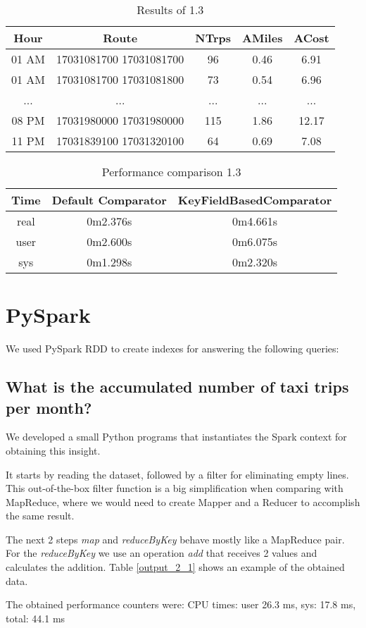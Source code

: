 \documentclass[conference,compsoc]{IEEEtran}
\begin{document}
\begin{table}[!t]
\renewcommand{\arraystretch}{1.3}
\caption{Results of 1.3}
\label{output_1_3}
\centering
\begin{tabular}{c|c||c|c|c}
\hline
\bfseries Hour & \bfseries Route & \bfseries NTrps & \bfseries AMiles & \bfseries ACost\\
\hline\hline

01 AM&17031081700 17031081700&96&0.46&6.91	\\
01 AM&17031081700 17031081800&73&0.54&6.96	\\
...&...&...&...&...	\\
08 PM&17031980000 17031980000&115&1.86&12.17\\
11 PM&17031839100 17031320100&64&0.69&7.08	\\

\hline
\end{tabular}
\end{table}

\begin{table}[!t]
\renewcommand{\arraystretch}{1.3}
\caption{Performance comparison 1.3}
\label{perf_1_4}
\centering
\begin{tabular}{c||c|c}
\hline
\bfseries Time & \bfseries Default Comparator & \bfseries KeyFieldBasedComparator \\
\hline\hline

 real & 0m2.376s           & 0m4.661s                \\
 user & 0m2.600s           & 0m6.075s                \\
 sys  & 0m1.298s           & 0m2.320s \\
\hline
\end{tabular}
\end{table}

\section{PySpark}
We used PySpark RDD to create indexes for answering the following queries:
\subsection{What is the accumulated number of taxi trips per month?}
We developed a small Python programs that instantiates the Spark context for obtaining this insight.\par It starts by reading the dataset,  followed by a filter for eliminating empty lines. This out-of-the-box filter function is a big simplification when comparing with MapReduce, where we would need to create Mapper and a Reducer to accomplish the same result.  \par
The next 2 steps \textit{map} and \textit{reduceByKey} behave mostly like a MapReduce pair. For the \textit{reduceByKey} we use an operation \textit{add} that receives 2 values and calculates the addition. Table \ref{output_2_1} shows an example of the obtained data.
\par
The obtained performance counters were: CPU times: user 26.3 ms, sys: 17.8 ms, total: 44.1 ms
\end{document}
